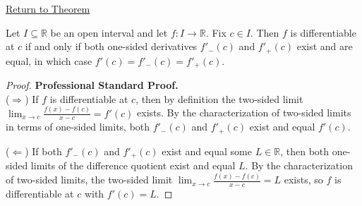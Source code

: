 \newpage
{}
\label{prf:differentiability-and-one-sided-derivatives}

\begin{remark*}[Return]
\hyperref[thm:differentiability-and-one-sided-derivatives]{Return to Theorem}
\end{remark*}

\begin{theorem*}
Let $I \subseteq \mathbb{R}$ be an open interval and let $f : I \to \mathbb{R}$. Fix $c \in I$. Then $f$ is differentiable at $c$ if and only if both one-sided derivatives $f'_-(c)$ and $f'_+(c)$ exist and are equal, in which case $f'(c) = f'_-(c) = f'_+(c)$.
\end{theorem*}

\begin{proof}
\textbf{Professional Standard Proof.}~\\
($\Rightarrow$) If $f$ is differentiable at $c$, then by definition the two-sided limit $\lim_{x \to c} \frac{f(x) - f(c)}{x - c} = f'(c)$ exists. By the characterization of two-sided limits in terms of one-sided limits, both $f'_-(c)$ and $f'_+(c)$ exist and equal $f'(c)$.

($\Leftarrow$) If both $f'_-(c)$ and $f'_+(c)$ exist and equal some $L \in \mathbb{R}$, then both one-sided limits of the difference quotient exist and equal $L$. By the characterization of two-sided limits, the two-sided limit $\lim_{x \to c} \frac{f(x) - f(c)}{x - c} = L$ exists, so $f$ is differentiable at $c$ with $f'(c) = L$.
\end{proof}

